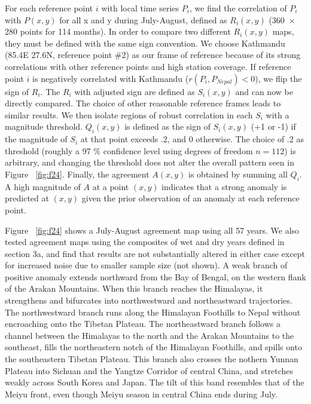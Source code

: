 	For each reference point $i$ with local time series $P_i$, we find the correlation of $P_i$ with $P(x,y)$ for all x and y during July-August, defined as $R_i(x,y)$ (360\ $\times$ 280 points for 114 months). In order to compare two different $R_i(x,y)$ maps, they must be defined with the same sign convention. We choose Kathmandu (85.4\textdegree E 27.6\textdegree N, reference point \#2) as our frame of reference because of its strong correlations with other reference points and high station coverage. If reference point $i$ is negatively correlated with Kathmandu ($r(P_i,P_{Nepal})<0$), we flip the sign of $R_i$. The $R_i$ with adjusted sign are defined as $S_i(x,y)$ and can now be directly compared. The choice of other reasonable reference frames leads to similar results. We then isolate regions of robust correlation in each $S_i$ with a magnitude threshold. $Q_i(x,y)$ is defined as the sign of $S_i(x,y)$ (+1 or -1) if the magnitude of $S_i$ at that point exceeds .2, and 0 otherwise. The choice of .2 as threshold (roughly a 97 \% confidence level using degrees of freedom $n=112$) is arbitrary, and changing the threshold does not alter the overall pattern seen in Figure ~\ref{fig:f24}. Finally, the agreement $A(x,y)$ is obtained by summing all $Q_i$. A high magnitude of $A$ at a point $(x,y)$ indicates that a strong anomaly is predicted at $(x,y)$ given the prior observation of an anomaly at each reference point.
	
	Figure ~\ref{fig:f24} shows a July-August agreement map using all 57 years. We also tested agreement maps using the composites of wet and dry years defined in section 3a, and find that results are not substantially altered in either case except for increased noise due to smaller sample size (not shown). A weak branch of positive anomaly extends northward from the Bay of Bengal, on the western flank of the Arakan Mountains. When this branch reaches the Himalayas, it strengthens and bifurcates into northwestward and northeastward trajectories. The northwestward branch runs along the Himalayan Foothills to Nepal without encroaching onto the Tibetan Plateau. The northeastward branch follows a channel between the Himalayas to the north and the Arakan Mountains to the southeast, fills the northeastern notch of the Himalayan Foothills, and spills onto the southeastern Tibetan Plateau. This branch also crosses the nothern Yunnan Plateau into Sichuan and the Yangtze Corridor of central China, and stretches weakly across South Korea and Japan. The tilt of this band resembles that of the Meiyu front, even though Meiyu season in central China ends during July. 
	
